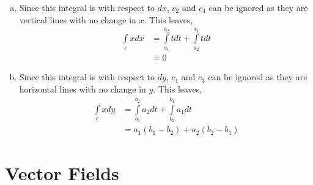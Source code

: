\documentclass{article}
\begin{document}
\begin{enumerate}[1.]
  \begin{enumerate}[a.]
    \item Since this integral is with respect to $dx$, $c_{2}$ and $c_{4}$ can
      be ignored as they are vertical lines with no change in $x$. This leaves,
      \begin{align*}
        \int\limits_{c} x dx &= \int\limits_{a_{1}}^{a_{2}} t dt +
        \int\limits_{a_{2}}^{a_{1}} t dt \\
        &= 0
      \end{align*}
    \item Since this integral is with respect to $dy$, $c_{1}$ and $c_{3}$ can
      be ignored as they are horizontal lines with no change in $y$. This
      leaves,
      \begin{align*}
        \int\limits_{c} x dy &= \int\limits_{b_{1}}^{b_{2}} a_{2} dt +
        \int\limits_{b_{2}}^{b_{1}} a_{1} dt \\
        &= a_{1}(b_{1} - b_{2}) + a_{2}(b_{2} - b_{1})
      \end{align*}
  \end{enumerate}

\end{enumerate}

\section{Vector Fields}
\end{document}

